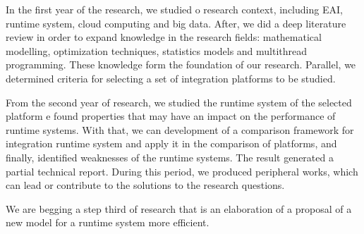 In the first year of the research, we studied o research context, including EAI, runtime system, cloud computing and big data. After, we did a deep literature review in order to expand knowledge in the research fields: mathematical modelling, optimization techniques, statistics models and multithread programming. These knowledge form the foundation of our research.
Parallel, we determined criteria for selecting a set of integration platforms to be studied.

From the second year of research, we studied the runtime system of the selected platform e found properties that may have an impact on the performance of runtime systems. With that, we can development of a comparison framework for integration runtime system and apply it in the comparison of platforms, and finally, identified weaknesses of the runtime systems. The result generated a partial technical report. During this period, we produced peripheral works, which can lead or contribute to the solutions to the research questions.

We are begging a step third of research that is an elaboration of a proposal of a new model for a runtime system more efficient.